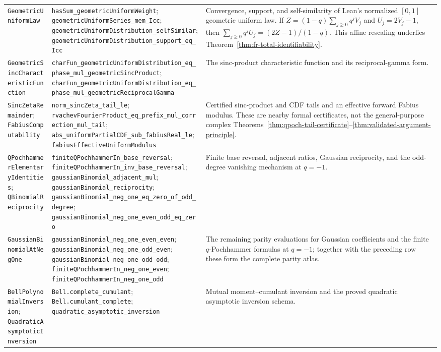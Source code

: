 \begin{longtable}{@{}>{\raggedright\arraybackslash}p{}>{\raggedright\arraybackslash}p{}>{\raggedright\arraybackslash}p{}@{}}
\nolinkurl{GeometricUniformLaw}
&
\nolinkurl{hasSum_geometricUniformWeight};
\nolinkurl{geometricUniformSeries_mem_Icc};
\nolinkurl{geometricUniformDistribution_selfSimilar};
\nolinkurl{geometricUniformDistribution_support_eq_Icc}
&
Convergence, support, and self-similarity of Lean's normalized \([0,1]\)
geometric uniform law.  If
\(Z=(1-q)\sum_{j\ge0}q^jV_j\) and \(U_j=2V_j-1\), then
\(\sum_{j\ge0}q^jU_j=(2Z-1)/(1-q)\).  This affine rescaling underlies
Theorem~\ref{thm:fr-total-identifiability}. \\

\nolinkurl{GeometricSincCharacteristicFunction}
&
\nolinkurl{charFun_geometricUniformDistribution_eq_phase_mul_geometricSincProduct};
\nolinkurl{charFun_geometricUniformDistribution_eq_phase_mul_geometricReciprocalGamma}
&
The sinc-product characteristic function and its reciprocal-gamma form. \\

\nolinkurl{SincZetaRemainder};
\nolinkurl{FabiusComputability}
&
\nolinkurl{norm_sincZeta_tail_le};
\nolinkurl{rvachevFourierProduct_eq_prefix_mul_correction_mul_tail};
\nolinkurl{abs_uniformPartialCDF_sub_fabiusReal_le};
\nolinkurl{fabiusEffectiveUniformModulus}
&
Certified sinc-product and CDF tails and an effective forward Fabius modulus.
These are nearby formal certificates, not the general-purpose complex
Theorems~\ref{thm:qpoch-tail-certificate}--\ref{thm:validated-argument-principle}. \\

\nolinkurl{QPochhammerElementaryIdentities};
\nolinkurl{QBinomialReciprocity}
&
\nolinkurl{finiteQPochhammerIn_base_reversal};
\nolinkurl{finiteQPochhammerIn_inv_base_reversal};
\nolinkurl{gaussianBinomial_adjacent_mul};
\nolinkurl{gaussianBinomial_reciprocity};
\nolinkurl{gaussianBinomial_neg_one_eq_zero_of_odd_degree};
\nolinkurl{gaussianBinomial_neg_one_even_odd_eq_zero}
&
Finite base reversal, adjacent ratios, Gaussian reciprocity, and the
odd-degree vanishing mechanism at \(q=-1\). \\

\nolinkurl{GaussianBinomialAtNegOne}
&
\nolinkurl{gaussianBinomial_neg_one_even_even};
\nolinkurl{gaussianBinomial_neg_one_odd_even};
\nolinkurl{gaussianBinomial_neg_one_odd_odd};
\nolinkurl{finiteQPochhammerIn_neg_one_even};
\nolinkurl{finiteQPochhammerIn_neg_one_odd}
&
The remaining parity evaluations for Gaussian coefficients and the finite
\(q\)-Pochhammer formulas at \(q=-1\); together with the preceding row these
form the complete parity atlas. \\

\nolinkurl{BellPolynomialInversion};
\nolinkurl{QuadraticAsymptoticInversion}
&
\nolinkurl{Bell.complete_cumulant};
\nolinkurl{Bell.cumulant_complete};
\nolinkurl{quadratic_asymptotic_inversion}
&
Mutual moment--cumulant inversion and the proved quadratic asymptotic
inversion schema. \\
\end{longtable}
\endgroup

